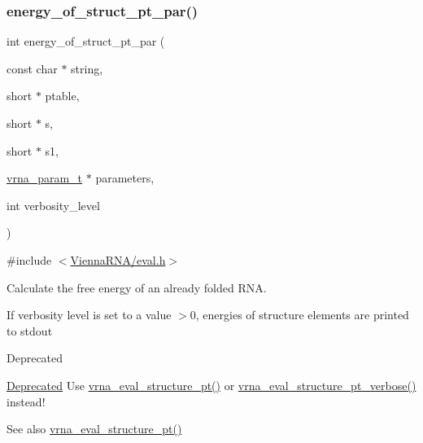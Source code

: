 \subsubsection{\texorpdfstring{energy\+\_\+of\+\_\+struct\+\_\+pt\+\_\+par()}{energy\_of\_struct\_pt\_par()}}
{\footnotesize\ttfamily int energy\+\_\+of\+\_\+struct\+\_\+pt\+\_\+par (\begin{DoxyParamCaption}\item[{const char $\ast$}]{string,  }\item[{short $\ast$}]{ptable,  }\item[{short $\ast$}]{s,  }\item[{short $\ast$}]{s1,  }\item[{\hyperlink{group__energy__parameters_ga8a69ca7d787e4fd6079914f5343a1f35}{vrna\+\_\+param\+\_\+t} $\ast$}]{parameters,  }\item[{int}]{verbosity\+\_\+level }\end{DoxyParamCaption})}



{\ttfamily \#include $<$\hyperlink{eval_8h}{Vienna\+R\+N\+A/eval.\+h}$>$}



Calculate the free energy of an already folded R\+NA. 

If verbosity level is set to a value $>$0, energies of structure elements are printed to stdout

\begin{DoxyRefDesc}{Deprecated}
\item[\hyperlink{deprecated__deprecated000054}{Deprecated}]Use \hyperlink{group__eval_gadbd09372ddfd7a450bbd590c96a6bfe4}{vrna\+\_\+eval\+\_\+structure\+\_\+pt()} or \hyperlink{group__eval_ga8a517cfeeae8c376ae7b1e0c401d38b4}{vrna\+\_\+eval\+\_\+structure\+\_\+pt\+\_\+verbose()} instead!\end{DoxyRefDesc}


\begin{DoxySeeAlso}{See also}
\hyperlink{group__eval_gadbd09372ddfd7a450bbd590c96a6bfe4}{vrna\+\_\+eval\+\_\+structure\+\_\+pt()}
\end{DoxySeeAlso}

